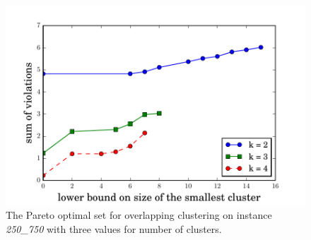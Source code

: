 \documentclass[conference]{IEEEtran}
\begin{document}
\begin{figure}
\centering
\includegraphics[scale=0.5]{images/pareto}
\captionsetup{font=small}
\caption{The Pareto optimal set for overlapping clustering on instance \emph{250\_750} with three values for number of clusters.}
\label{fig:pareto}
\end{figure}
\end{document}
